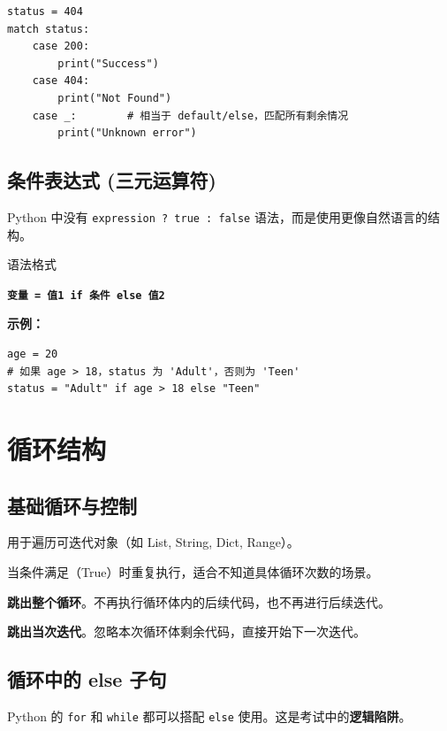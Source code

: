 \documentclass[12pt, a4paper]{article}
\begin{document}
\begin{lstlisting}
status = 404
match status:
    case 200:
        print("Success")
    case 404:
        print("Not Found")
    case _:        # 相当于 default/else，匹配所有剩余情况
        print("Unknown error")
\end{lstlisting}

\subsection{条件表达式 (三元运算符)}

Python 中没有 \texttt{expression ? true : false} 语法，而是使用更像自然语言的结构。

\begin{importantbox}{语法格式}
\centerline{\texttt{\textbf{变量 = 值1 if 条件 else 值2}}}
\end{importantbox}

\textbf{示例：}
\begin{lstlisting}
age = 20
# 如果 age > 18，status 为 'Adult'，否则为 'Teen'
status = "Adult" if age > 18 else "Teen"
\end{lstlisting}

\section{循环结构}

\subsection{基础循环与控制}

\begin{description}[style=multiline, leftmargin=3cm]
    \item[for 循环] 用于遍历可迭代对象（如 List, String, Dict, Range）。
    \item[while 循环] 当条件满足（True）时重复执行，适合不知道具体循环次数的场景。
    \item[break] \textbf{跳出整个循环}。不再执行循环体内的后续代码，也不再进行后续迭代。
    \item[continue] \textbf{跳出当次迭代}。忽略本次循环体剩余代码，直接开始下一次迭代。
\end{description}

\subsection{循环中的 else 子句}

Python 的 \texttt{for} 和 \texttt{while} 都可以搭配 \texttt{else} 使用。这是考试中的\textbf{逻辑陷阱}。
\end{document}
